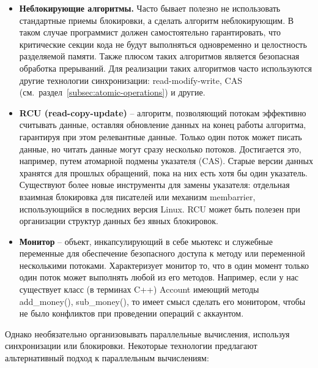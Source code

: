 \begin{itemize}
    \item\textbf{Неблокирующие алгоритмы.} Часто бывает полезно не использовать стандартные приемы блокировки, а сделать алгоритм неблокирующим.
    В таком случае программист должен самостоятельно гарантировать, что критические секции кода не будут выполняться одновременно и целостность разделяемой памяти.
    Также плюсом таких алгоритмов является безопасная обработка прерываний.
    Для реализации таких алгоритмов часто используются другие технологии синхронизации: read-modify-write, CAS (см.\ раздел~\ref{subsec:atomic-operations}) и другие.
    
    \item\textbf{RCU (read-copy-update)} -- алгоритм, позволяющий потокам эффективно считывать данные, оставляя обновление данных на конец работы алгоритма, гарантируя при этом релевантные данные.
    Только один поток может писать данные, но читать данные могут сразу несколько потоков.
    Достигается это, например, путем атомарной подмены указателя (CAS). Старые версии данных хранятся для прошлых обращений, пока на них есть хотя бы один указатель.
    Существуют более новые инструменты для замены указателя: отдельная взаимная блокировка для писателей или механизм membarrier, использующийся в последних версия Linux.
    RCU может быть полезен при организации структур данных без явных блокировок.
    
    \item\textbf{Монитор} -- объект, инкапсулирующий в себе мьютекс и служебные переменные для обеспечение безопасного доступа к методу или переменной несколькими потоками.
    Характеризует монитор то, что в один момент только один поток может выполнять любой из его методов.
    Например, если у нас существует класс (в терминах C++) Account имеющий методы add\_money(), sub\_money(), то имеет смысл сделать его монитором, чтобы не было конфликтов при проведении операций с аккаунтом.
\end{itemize}

Однако необязательно организовывать параллельные вычисления, используя синхронизации или блокировки.
Некоторые технологии предлагают альтернативный подход к параллельным вычислениям:

